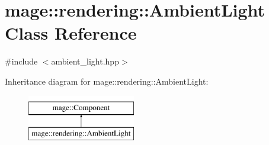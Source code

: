 \hypertarget{classmage_1_1rendering_1_1_ambient_light}{}\section{mage\+:\+:rendering\+:\+:Ambient\+Light Class Reference}
\label{classmage_1_1rendering_1_1_ambient_light}


{\ttfamily \#include $<$ambient\+\_\+light.\+hpp$>$}

Inheritance diagram for mage\+:\+:rendering\+:\+:Ambient\+Light\+:\begin{figure}[H]
\begin{center}
\leavevmode
\includegraphics[height=2.000000cm]{classmage_1_1rendering_1_1_ambient_light}
\end{center}
\end{figure}
